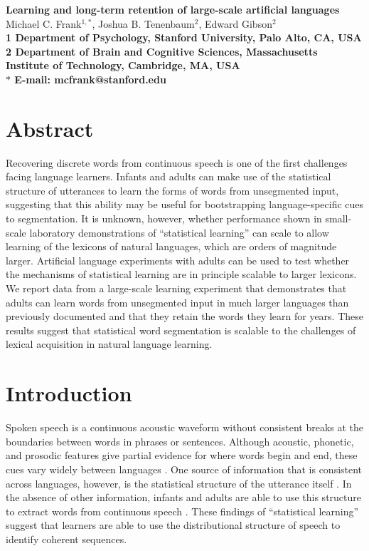 \documentclass[10pt]{article}
\date{}
\begin{document}
\begin{flushleft}
{\Large
\textbf{Learning and long-term retention of large-scale artificial languages}
}
\\
Michael C. Frank$^{1,\ast}$, 
 Joshua B. Tenenbaum$^{2}$, 
Edward Gibson$^{2}$
\\
\bf{1} Department of Psychology, Stanford University, Palo Alto, CA, USA
\\
\bf{2} Department of Brain and Cognitive Sciences, Massachusetts Institute of Technology, Cambridge, MA, USA
\\
$\ast$ E-mail: mcfrank@stanford.edu
\end{flushleft}

\section*{Abstract}
Recovering discrete words from continuous speech is one of the first challenges facing language learners. Infants and adults can make use of the statistical structure of utterances to learn the forms of words from unsegmented input, suggesting that this ability may be useful for bootstrapping language-specific cues to segmentation. It is unknown, however, whether performance shown in small-scale laboratory demonstrations of ``statistical learning'' can scale to allow learning of the lexicons of natural languages, which are orders of magnitude larger. Artificial language experiments with adults can be used to test whether the mechanisms of statistical learning are in principle scalable to larger lexicons. We report data from a large-scale learning experiment that demonstrates that adults can learn words from unsegmented input in much larger languages than previously documented and that they retain the words they learn for years. These results suggest that statistical word segmentation is scalable to the challenges of lexical acquisition in natural language learning.

\section*{Introduction}

Spoken speech is a continuous acoustic waveform without consistent breaks at the boundaries between words in phrases or sentences. Although acoustic, phonetic, and prosodic features give partial evidence for where words begin and end, these cues vary widely between languages \cite{jusczyk2000}. One source of information that is consistent across languages, however, is the statistical structure of the utterance itself \cite{harris1951}. In the absence of other information, infants and adults are able to use this structure to extract words from continuous speech \cite{saffran1996a,saffran1996b}. These findings of ``statistical learning'' suggest that learners are able to use the distributional structure of speech to identify coherent sequences. 
\end{document}
